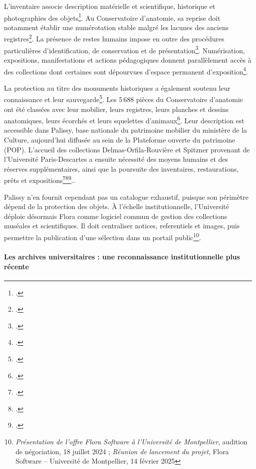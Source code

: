 L'inventaire associe description matérielle et scientifique, historique et photographies des objets\footcite[54--57]{BourgadeTheronAumasson2014}. Au Conservatoire d'anatomie, sa reprise doit notamment établir une numérotation stable malgré les lacunes des anciens registres\footcite{Wenger2025}. La présence de restes humains impose en outre des procédures particulières d'identification, de conservation et de présentation\footcite{Ducourau2016}. Numérisation, expositions, manifestations et actions pédagogiques donnent parallèlement accès à des collections dont certaines sont dépourvues d'espace permanent d'exposition\footcite[58--61]{BourgadeTheronAumasson2014}.

La protection au titre des monuments historiques a également soutenu leur connaissance et leur sauvegarde\footcite{Palouzie2011}. Les 5\,688 pièces du Conservatoire d'anatomie ont été classées avec leur mobilier, leurs registres, leurs planches et dessins anatomiques, leurs écorchés et leurs squelettes d'animaux\footcite{POPAnatomieMontpellier}. Leur description est accessible dans Palissy, base nationale du patrimoine mobilier du ministère de la Culture, aujourd'hui diffusée au sein de la Plateforme ouverte du patrimoine (POP). L'accueil des collections Delmas-Orfila-Rouvière et Spitzner provenant de l'Université Paris-Descartes a ensuite nécessité des moyens humains et des réserves supplémentaires, ainsi que la poursuite des inventaires, restaurations, prêts et expositions\footcite[p.~62--65]{Girard2014}\footcite{PalouzieDucourau2017}\footcite{DucourauPinail2021}..

Palissy n'en fournit cependant pas un catalogue exhaustif, puisque son périmètre dépend de la protection des objets. À l'échelle institutionnelle, l'Université déploie désormais Flora comme logiciel commun de gestion des collections muséales et scientifiques. Il doit centraliser notices, \glspl{referentiel} et images, puis permettre la publication d'une sélection dans un portail public\footnote{\emph{Présentation de l'offre Flora Software à l'Université de Montpellier}, audition de négociation, 18 juillet 2024 ; \emph{Réunion de lancement du projet}, Flora Software -- Université de Montpellier, 14 février 2025}.

\paragraph{Les archives universitaires : une reconnaissance institutionnelle plus récente}

